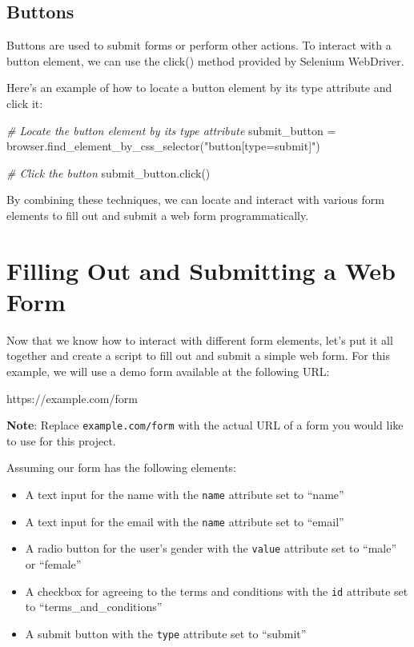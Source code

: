 \documentclass[
  paper=a4,
  ,captions=tableheading
]{scrartcl}
\newenvironment{Shaded}{}{}
\newcommand{\CommentTok}[1]{\textcolor[rgb]{0.38,0.63,0.69}{\textit{#1}}}
\newcommand{\NormalTok}[1]{#1}
\newcommand{\OperatorTok}[1]{\textcolor[rgb]{0.40,0.40,0.40}{#1}}
\newcommand{\StringTok}[1]{\textcolor[rgb]{0.25,0.44,0.63}{#1}}
\providecommand{\tightlist}{%
  \setlength{\itemsep}{0pt}\setlength{\parskip}{0pt}}
\begin{document}
\hypertarget{buttons}{%
\subsection{Buttons}\label{buttons}}

Buttons are used to submit forms or perform other actions. To interact
with a button element, we can use the click() method provided by
Selenium WebDriver.

Here's an example of how to locate a button element by its type
attribute and click it:

\begin{Shaded}
\begin{Highlighting}[]
\CommentTok{\# Locate the button element by its \textquotesingle{}type\textquotesingle{} attribute}
\NormalTok{submit\_button }\OperatorTok{=}\NormalTok{ browser.find\_element\_by\_css\_selector(}\StringTok{"button[type=\textquotesingle{}submit\textquotesingle{}]"}\NormalTok{)}

\CommentTok{\# Click the button}
\NormalTok{submit\_button.click()}
\end{Highlighting}
\end{Shaded}

By combining these techniques, we can locate and interact with various
form elements to fill out and submit a web form programmatically.

\hypertarget{filling-out-and-submitting-a-web-form}{%
\section{Filling Out and Submitting a Web
Form}\label{filling-out-and-submitting-a-web-form}}

Now that we know how to interact with different form elements, let's put
it all together and create a script to fill out and submit a simple web
form. For this example, we will use a demo form available at the
following URL:

https://example.com/form

\textbf{Note}: Replace \texttt{example.com/form} with the actual URL of
a form you would like to use for this project.

Assuming our form has the following elements:

\begin{itemize}
\tightlist
\item
  A text input for the name with the \texttt{name} attribute set to
  ``name''
\item
  A text input for the email with the \texttt{name} attribute set to
  ``email''
\item
  A radio button for the user's gender with the \texttt{value} attribute
  set to ``male'' or ``female''
\item
  A checkbox for agreeing to the terms and conditions with the
  \texttt{id} attribute set to ``terms\_and\_conditions''
\item
  A submit button with the \texttt{type} attribute set to ``submit''
\end{itemize}
\end{document}
